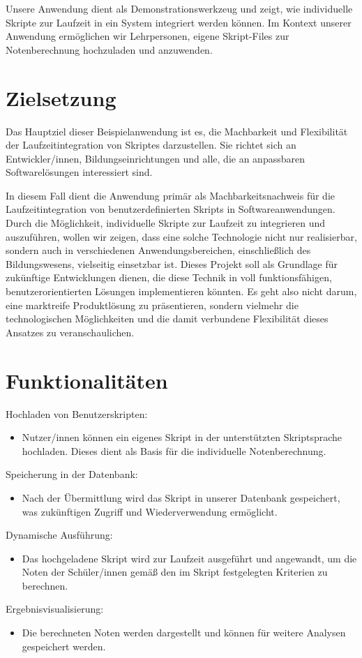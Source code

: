 Unsere Anwendung dient als Demonstrationswerkzeug und zeigt, wie individuelle Skripte zur 
Laufzeit in ein System integriert werden können. Im Kontext unserer Anwendung ermöglichen wir 
Lehrpersonen, eigene Skript-Files zur Notenberechnung hochzuladen und anzuwenden.

\newpage
\section*{Zielsetzung}
Das Hauptziel dieser Beispielanwendung ist es, die Machbarkeit und Flexibilität der 
Laufzeitintegration von Skriptes darzustellen. Sie richtet sich an Entwickler/innen, 
Bildungseinrichtungen und alle, die an anpassbaren Softwarelösungen interessiert sind.

In diesem Fall dient die Anwendung primär als Machbarkeitsnachweis für die Laufzeitintegration 
von benutzerdefinierten Skripts in Softwareanwendungen. Durch die Möglichkeit, individuelle 
Skripte zur Laufzeit zu integrieren und auszuführen, wollen wir zeigen, dass eine solche 
Technologie nicht nur realisierbar, sondern auch in verschiedenen Anwendungsbereichen, 
einschließlich des Bildungswesens, vielseitig einsetzbar ist. Dieses Projekt soll als 
Grundlage für zukünftige Entwicklungen dienen, die diese Technik in voll funktionsfähigen, 
benutzerorientierten Lösungen implementieren könnten. Es geht also nicht darum, 
eine marktreife Produktlösung zu präsentieren, sondern vielmehr die technologischen 
Möglichkeiten und die damit verbundene Flexibilität dieses Ansatzes zu veranschaulichen.

\newpage
\section*{Funktionalitäten}

Hochladen von Benutzerskripten:
\begin{itemize}
    \item Nutzer/innen können ein eigenes Skript in der unterstützten Skriptsprache hochladen. 
    Dieses dient als Basis für die individuelle Notenberechnung.
\end{itemize}

Speicherung in der Datenbank:
\begin{itemize}
    \item Nach der Übermittlung wird das Skript in unserer Datenbank gespeichert, was zukünftigen 
    Zugriff und Wiederverwendung ermöglicht.
\end{itemize} 

Dynamische Ausführung: 
\begin{itemize}
    \item Das hochgeladene Skript wird zur Laufzeit ausgeführt und angewandt, 
    um die Noten der Schüler/innen gemäß den im Skript festgelegten Kriterien zu berechnen.
\end{itemize}

Ergebnisvisualisierung: 
\begin{itemize}
    \item Die berechneten Noten werden dargestellt und können 
    für weitere Analysen gespeichert werden.
\end{itemize}

